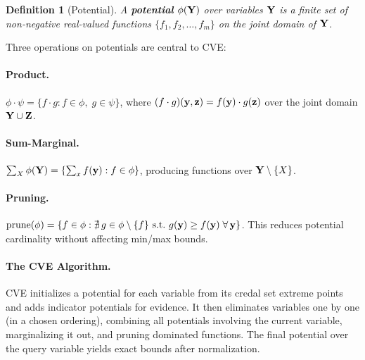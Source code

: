 \documentclass{article}
\newtheorem{definition}{Definition}
\begin{document}
\begin{definition}[Potential]
A \textbf{potential} $\phi(\mathbf{Y})$ over variables $\mathbf{Y}$ is a finite set
of non-negative real-valued functions $\{f_1, f_2, \dots, f_m\}$ on the joint domain
of $\mathbf{Y}$.
\end{definition}

Three operations on potentials are central to CVE:

\paragraph{Product.}
$\phi \cdot \psi = \{f \cdot g : f \in \phi, \; g \in \psi\}$,
where $(f \cdot g)(\mathbf{y}, \mathbf{z}) = f(\mathbf{y}) \cdot g(\mathbf{z})$
over the joint domain $\mathbf{Y} \cup \mathbf{Z}$.

\paragraph{Sum-Marginal.}
$\sum_{X} \phi(\mathbf{Y}) = \{ \sum_{x} f(\mathbf{y}) : f \in \phi \}$,
producing functions over $\mathbf{Y} \setminus \{X\}$.

\paragraph{Pruning.}
$\mathrm{prune}(\phi) = \{f \in \phi : \nexists\, g \in \phi \setminus \{f\}
\text{ s.t.\ } g(\mathbf{y}) \geq f(\mathbf{y})\; \forall\, \mathbf{y}\}$.
This reduces potential cardinality without affecting min/max bounds.

\paragraph{The CVE Algorithm.} CVE initializes a potential for each variable from its credal set extreme points and adds indicator potentials for evidence. It then eliminates variables one by one (in a chosen ordering), combining all potentials involving the current variable, marginalizing it out, and pruning dominated functions. The final potential over the query variable yields exact bounds after normalization.
\end{document}

